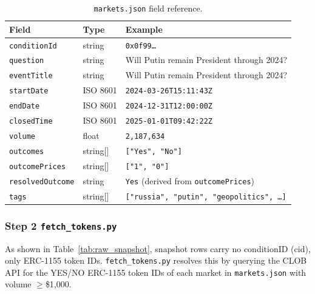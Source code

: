 \documentclass[11pt,a4paper]{article}
\begin{document}
\begin{table}[H]
\centering
\caption{\texttt{markets.json} field reference.}
\label{tab:markets_schema}
\small
\begin{tabularx}{\textwidth}{l l X}
\toprule
\textbf{Field} & \textbf{Type} & \textbf{Example} \\
\midrule
\texttt{conditionId}     & string   & \texttt{0x0f99\ldots} \\
\texttt{question}        & string   & Will Putin remain President through 2024? \\
\texttt{eventTitle}      & string   & Will Putin remain President through 2024? \\
\texttt{startDate}       & ISO 8601 & \texttt{2024-03-26T15:11:43Z} \\
\texttt{endDate}         & ISO 8601 & \texttt{2024-12-31T12:00:00Z} \\
\texttt{closedTime}      & ISO 8601 & \texttt{2025-01-01T09:42:22Z} \\
\texttt{volume}          & float    & \texttt{2{,}187{,}634} \\
\texttt{outcomes}        & string[] & \texttt{["Yes", "No"]} \\
\texttt{outcomePrices}   & string[] & \texttt{["1", "0"]} \\
\texttt{resolvedOutcome} & string   & \texttt{Yes} (derived from \texttt{outcomePrices}) \\
\texttt{tags}            & string[] & \texttt{["russia", "putin", "geopolitics", \ldots]} \\
\bottomrule
\end{tabularx}
\end{table}





\subsubsection*{Step 2 \texttt{fetch\_tokens.py}}

As shown in Table~\ref{tab:raw_snapshot}, snapshot rows carry no 
conditionID (cid), only ERC-1155 token IDs. \texttt{fetch\_tokens.py} 
resolves this by querying the CLOB API for the YES/NO ERC-1155 token IDs of 
each market in \texttt{markets.json} with volume $\geq$\$1{,}000. 
\end{document}

